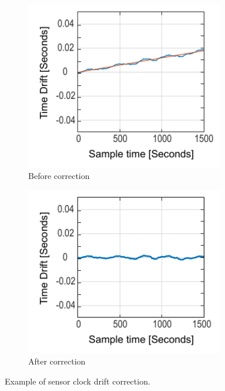 \begin{figure}[!htb]
    \centering
    \begin{subfigure}{0.45\textwidth}
        \centering
        \includegraphics[width=0.95\textwidth]{content/3-Methods/Clock_Drift.pdf}
        \caption{Before correction}
    \end{subfigure}
    \begin{subfigure}{0.45\textwidth}
        \centering
        \includegraphics[width=0.95\textwidth]{content/3-Methods/Clock_Drift_Corrected.pdf}
        \caption{After correction}
    \end{subfigure}
    \caption{Example of sensor clock drift correction.}
    \label{fig:methods-clock-drift-correction}
\end{figure}

